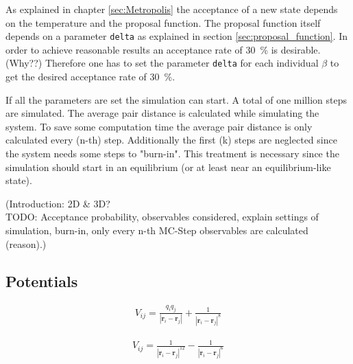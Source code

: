 \documentclass[11pt, a4paper]{article}
\numberwithin{equation}{section}
\newcommand{\remark}[1]{{\color{red}(#1)}}
\begin{document}
As explained in chapter \ref{sec:Metropolis} the acceptance of a new state depends on the temperature and the proposal function.
The proposal function itself depends on a parameter \texttt{delta} as explained in section \ref{sec:proposal_function}.
In order to achieve reasonable results an acceptance rate of \SI{30}{\percent} is desirable. \remark{Why??}
Therefore one has to set the parameter \texttt{delta} for each individual $\beta$ to get the desired acceptance rate of \SI{30}{\percent}.

If all the parameters are set the simulation can start.
A total of one million steps are simulated.
The average pair distance is calculated while simulating the system.
To save some computation time the average pair distance is only calculated every \remark{n-th} step.
Additionally the first \remark{k} steps are neglected since the system needs some steps to "burn-in".
This treatment is necessary since the simulation should start in an equilibrium (or at least near an equilibrium-like state).


\remark{Introduction: 2D \& 3D?\\
TODO: Acceptance probability, observables considered, explain settings of simulation, burn-in, only every n-th MC-Step observables are calculated (reason).}

\subsection{Potentials} \label{sec:Potentials}


\begin{align*}
	V_{ij} = \frac{q_i q_j}{| \mathbf{r}_i - \mathbf{r}_j |} + \frac{1}{| \mathbf{r}_i - \mathbf{r}_j |^8}
\end{align*}

\begin{align*}
V_{ij} = \frac{1}{| \mathbf{r}_i - \mathbf{r}_j |^{12}} - \frac{1}{| \mathbf{r}_i - \mathbf{r}_j |^6}
\end{align*}
\end{document}
